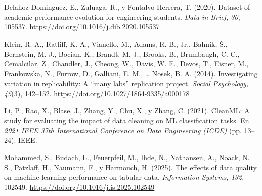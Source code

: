 \documentclass[11pt,openany,oneside,letterpaper]{book}
\makeatletter
\renewenvironment{thebibliography}[1]
  {\chapter*{\bibname}\addcontentsline{toc}{chapter}{\bibname}%
   \def\@biblabel##1{}\list{}{\usecounter{enumiv}\setlength{\leftmargin}{1.27cm}\setlength{\itemindent}{-1.27cm}%
   \setlength{\itemsep}{4pt}\setlength{\parsep}{0pt}}\sloppy}
  {\endlist}
\makeatother
\begin{document}
 \backmatter

\begin{thebibliography}{xx}

 Delahoz-Dominguez, E., Zuluaga, R., y Fontalvo-Herrera, T. (2020). Dataset of academic performance evolution for engineering students. \emph{Data in Brief, 30}, 105537. \url{https://doi.org/10.1016/j.dib.2020.105537}

 Klein, R. A., Ratliff, K. A., Vianello, M., Adams, R. B., Jr., Bahník, Š., Bernstein, M. J., Bocian, K., Brandt, M. J., Brooks, B., Brumbaugh, C. C., Cemalcilar, Z., Chandler, J., Cheong, W., Davis, W. E., Devos, T., Eisner, M., Frankowska, N., Furrow, D., Galliani, E. M., \ldots{} Nosek, B. A. (2014). Investigating variation in replicability: A ``many labs'' replication project. \emph{Social Psychology, 45}(3), 142--152. \url{https://doi.org/10.1027/1864-9335/a000178}

 Li, P., Rao, X., Blase, J., Zhang, Y., Chu, X., y Zhang, C. (2021). CleanML: A study for evaluating the impact of data cleaning on ML classification tasks. En \emph{2021 IEEE 37th International Conference on Data Engineering (ICDE)} (pp. 13--24). IEEE.

 Mohammed, S., Budach, L., Feuerpfeil, M., Ihde, N., Nathansen, A., Noack, N. S., Patzlaff, H., Naumann, F., y Harmouch, H. (2025). The effects of data quality on machine learning performance on tabular data. \emph{Information Systems, 132}, 102549. \url{https://doi.org/10.1016/j.is.2025.102549}
\end{thebibliography}
\end{document}
